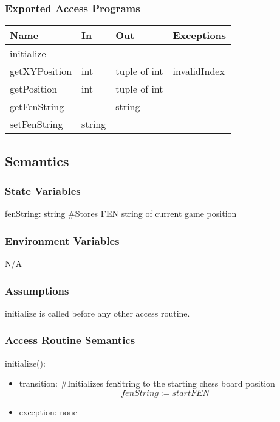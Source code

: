 \documentclass[12pt, titlepage]{article}
\begin{document}
    \subsubsection{Exported Access Programs}
        \begin{center}
        \begin{tabular}{p{4.5cm} p{4cm} p{3cm} p{2.5cm}}
        \hline
        \textbf{Name} & \textbf{In} & \textbf{Out} & \textbf{Exceptions} \\
        \hline
        initialize & & & \\
        \hline
        getXYPosition & int & tuple of int & invalidIndex\\
        \hline
        getPosition & int & tuple of int & \\
        \hline
        getFenString & & string & \\
        \hline
        setFenString & string & & \\
        \hline
        \end{tabular}
        \end{center}

    \subsection{Semantics}
    \subsubsection{State Variables}
    fenString: string \#Stores FEN string of current game position

    \subsubsection{Environment Variables}
    N/A

    \subsubsection{Assumptions}
    initialize is called before any other access routine.

    \subsubsection{Access Routine Semantics}
        \noindent initialize():
        \begin{itemize}
            \item transition: \#Initializes fenString to the starting chess board position \\
                \[fenString := startFEN\]
            \item exception: none
        \end{itemize}
\end{document}
